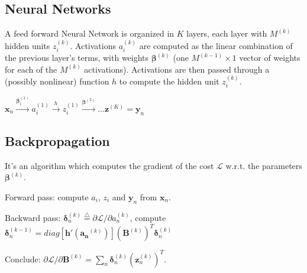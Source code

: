 \documentclass[10pt,a4paper,landscape]{article}
\renewcommand{\bf}[1]{\ensuremath{\mathbf{#1}}}
\newcommand{\bbeta}{\boldsymbol\beta}
\newcommand{\bdelta}{\boldsymbol\delta}
\newcommand{\defop}{\stackrel{\bigtriangleup}{=}}
\begin{document}
\begin{multicols*}{4}

\section{Neural Networks}
A feed forward Neural Network is organized in $K$ layers, each layer with $M^{(k)}$ hidden units $z_i^{(k)}$. Activations $a_i^{(k)}$ are computed as the linear combination of the previous layer's terms, with weights $\bbeta^{(k)}$ (one $M^{(k-1)} \times 1$ vector of weights for each of the $M^{(k)}$ activations). Activations are then passed through a (possibly nonlinear) function $h$ to compute the hidden unit $z_i^{(k)}$.

$\bf{x}_n \xrightarrow{\bbeta_i^{(1)}} a_i^{(1)} \xrightarrow{h} z_i^{(1)} \xrightarrow{\bbeta^{(2)}} \dots \bf{z}^{(K)} = \bf{y}_n$

\subsection{Backpropagation}
It's an algorithm which computes the gradient of the cost $\mathcal{L}$ w.r.t. the parameters $\bbeta^{(k)}$.

Forward pass: compute $a_i$, $z_i$ and $\bf{y}_n$ from $\bf{x}_n$.


Backward pass: $\bdelta_n^{(k)} \defop \partial\mathcal{L}/\partial a_n^{(k)}$, compute $\bdelta_n^{(k-1)}= diag\left[ \mathbf{h}'(\mathbf{a_n}^{(k)}) \right]\left( \mathbf{B}^{(k)} \right)^T\bdelta_n^{(k)}$

Conclude: $\partial\mathcal{L}/\partial\mathbf{B}^{(k)} = \sum_n\bdelta_n^{(k)}\left( \mathbf{z}_n^{(k)} \right)^T$.

%
%

\end{multicols*}
\end{document}
